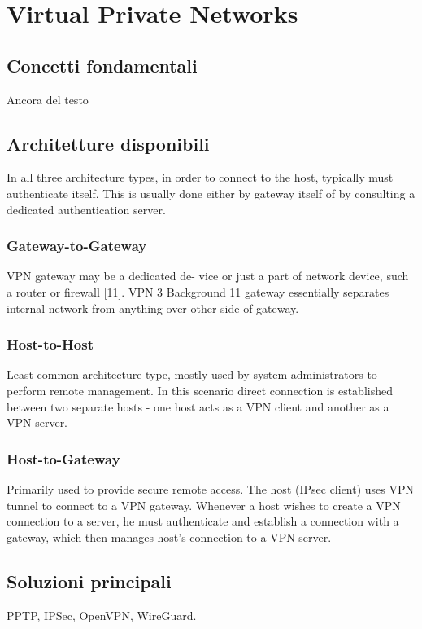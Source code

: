 \section{Virtual Private Networks }

\subsection{Concetti fondamentali}
Ancora del testo

\subsection{Architetture disponibili}
In all three architecture types, in order to connect to the host, typically must authenticate itself. This is usually done either by gateway itself of by consulting a dedicated authentication server.

\subsubsection{Gateway-to-Gateway}
VPN gateway may be a dedicated de- vice or just a part of network device, such a router or firewall [11]. VPN
3 Background 11
gateway essentially separates internal network from anything over other side of gateway.


\subsubsection{Host-to-Host}
Least common architecture type, mostly used by system administrators to perform remote management. In this scenario direct connection is established between two separate hosts - one host acts as a VPN client and another as a VPN server.

\subsubsection{Host-to-Gateway}
Primarily used to provide secure remote access. The host (IPsec client) uses VPN tunnel to connect to a VPN gateway. Whenever a host wishes to create a VPN connection to a server, he must authenticate and establish a connection with a gateway, which then manages host's connection to a VPN server.
\subsection{Soluzioni principali}
PPTP, IPSec, OpenVPN, WireGuard.

